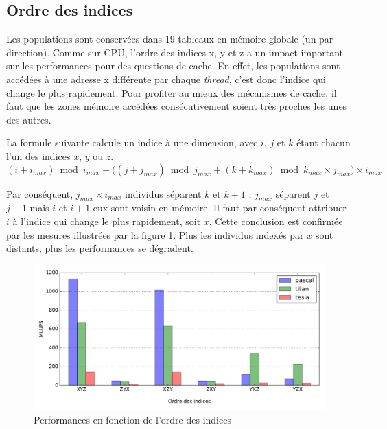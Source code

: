 \subsection{Ordre des indices}

Les populations sont conservées dans 19 tableaux en mémoire globale (un par direction). Comme sur \acs{CPU}, l'ordre des indices x, y et z a un impact important sur les performances pour des questions de cache. En effet, les populations sont accédées à une adresse x différente par chaque \textit{thread}, c'est donc l'indice qui change le plus rapidement. Pour profiter au mieux des mécanismes de cache, il faut que les zones mémoire accédées consécutivement soient très proches les unes des autres.

La formule suivante calcule un indice à une dimension, avec $i$, $j$ et $k$ étant chacun l'un des indices $x$, $y$ ou $z$.
\begin{equation}
(i+i_{max}) \bmod i_{max} + \Big((j+j_{max}) \bmod j_{max} + ( k+k_{max}) \bmod k_{max} \times j_{max}\Big) \times i_{max} 
\end{equation}

Par conséquent, $j_{max} \times i_{max}$ individus séparent $k$ et $k+1$ , $j_{max}$ séparent $j$ et $j+1$ mais $i$ et $i+1$ eux sont voisin en mémoire. Il faut par conséquent attribuer $i$ à l'indice qui change le plus rapidement, soit $x$. Cette conclusion est confirmée par les mesures illustrées par la figure \ref{fig:index_order}. Plus les individus indexés par $x$ sont distants, plus les performances se dégradent.
 
\begin{figure}[H]
	\centering
	\includegraphics[fbox, scale=0.61]{images/perfs/lbm_simple_lbmcuda/index_order.pdf}
	\caption{Performances en fonction de l'ordre des indices}
	\label{fig:index_order}
\end{figure}

